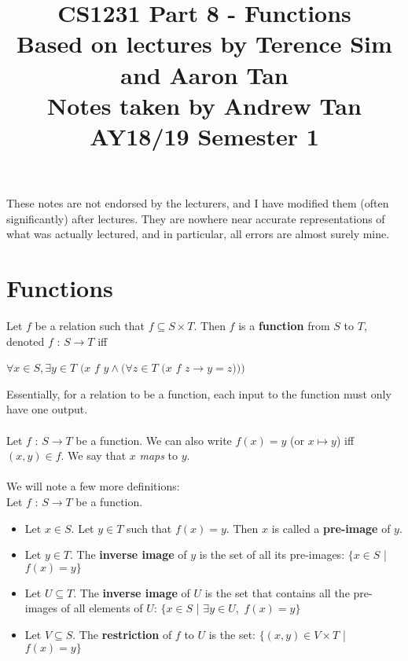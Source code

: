 \documentclass[a4paper]{article}
\title{%
	CS1231 Part 8 - Functions  \\
	\large Based on lectures by Terence Sim and Aaron Tan
	\\ Notes taken by Andrew Tan
	\\ AY18/19 Semester 1
	\\ }
\author{}
\date{\vspace{-5ex}}
\begin{document}
\maketitle

\begin{center}\begin{minipage}[c]{0.9\textwidth}\centering\footnotesize These notes are not endorsed by the lecturers, and I have modified them (often significantly) after lectures. They are nowhere near accurate representations of what was actually lectured, and in particular, all errors are almost surely mine.\end{minipage}\end{center}

\section{Functions}
Let $f$ be a relation such that $f \subseteq S \times T$. Then $f$ is a \textbf{function} from $S$ to $T$, denoted $f$ : $S \rightarrow T$ iff
\begin{center}
	$\forall x \in S, \exists y \in T$ $(x$ $f$ $y\land (\forall z \in T$ $(x$ $f$ $z \rightarrow y = z)))$
\end{center}
Essentially, for a relation to be a function, each input to the function must only have one output.\\ \\
Let $f$ : $S\rightarrow T$ be a function. We can also write $f(x) = y$ (or $x\mapsto y$) iff $(x,y) \in f$. We say that $x$ \textit{maps} to $y$.\\ \\
We will note a few more definitions:\\
Let $f$ : $S \rightarrow T$ be a function.
\begin{itemize}
	\item Let $x\in S$. Let $y \in T$ such that $f(x) = y$. Then $x$ is called a \textbf{pre-image} of $y$.
	\item Let $y \in T$. The \textbf{inverse image} of $y$ is the set of all its pre-images: $\{x \in S$ | $f(x) = y\}$
	\item Let $U \subseteq T$. The \textbf{inverse image} of $U$ is the set that contains all the pre-images of all elements of $U$: $\{x \in S$ | $\exists y \in U,$ $f(x) = y\}$
	\item Let $V \subseteq S$. The \textbf{restriction} of $f$ to $U$ is the set: $\{(x,y) \in V \times T$ | $f(x) = y\}$
\end{itemize}
\end{document}
